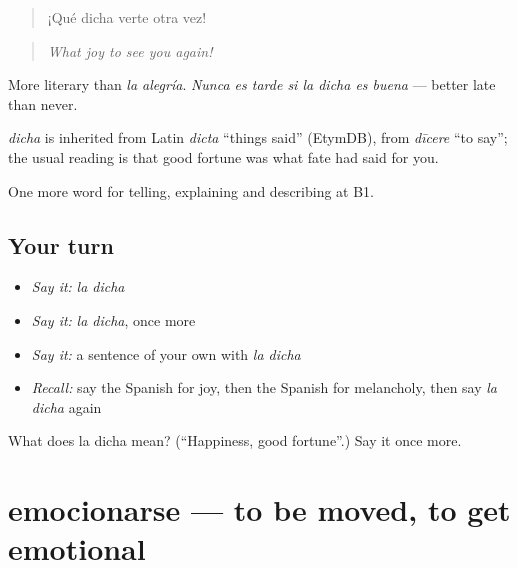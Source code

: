 \begin{quote}
¡Qué dicha verte otra vez!
\end{quote}

\begin{quote}
\emph{What joy to see you again!}
\end{quote}

More literary than \emph{la alegría}. \emph{Nunca es tarde si la dicha es buena} — better late than never.

\begin{cousinweb}
\emph{dicha} is inherited from Latin \emph{dicta} \textquotedblleft{}things said\textquotedblright{} (EtymDB), from \emph{dīcere} \textquotedblleft{}to say\textquotedblright{}; the usual reading is that good fortune was what fate had said for you.
\end{cousinweb}

\begin{grammarlens}[title={What you've built}]
One more word for telling, explaining and describing at B1.
\end{grammarlens}

\subsection*{Your turn}
\begin{itemize}
\raggedright
  \item \emph{Say it:} \emph{la dicha}
  \item \emph{Say it:} \emph{la dicha}, once more
  \item \emph{Say it:} a sentence of your own with \emph{la dicha}
  \item \emph{Recall:} say the Spanish for joy, then the Spanish for melancholy, then say \emph{la dicha} again
\end{itemize}

\begin{tcolorbox}[breakable,colback=teal!4,colframe=teal!35!black,title={Before you move on}]
What does la dicha mean? (\textquotedblleft{}Happiness, good fortune\textquotedblright{}.) Say it once more.
\end{tcolorbox}
\section[emocionarse]{emocionarse — to be moved, to get emotional}

\label{lesson:ES-C704-emocionarse}




